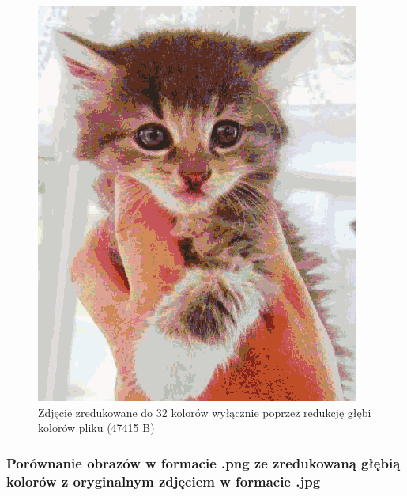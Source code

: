 \begin{figure}[H]
\begin{minipage}[b]{0.25\textwidth}
    \includegraphics[width=\textwidth]{photos/kmeans_red_32_0}
    \caption{Zdjęcie zredukowane do 32 kolorów wyłącznie poprzez redukcję głębi kolorów pliku (47415 B)}
  \end{minipage}
\end{figure}


\subsubsection{Porównanie obrazów w formacie .png ze zredukowaną głębią kolorów z oryginalnym zdjęciem w formacie .jpg}

\label{f:red_vs_jpg}

